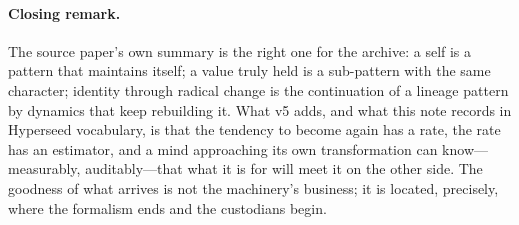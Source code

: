 \documentclass[11pt]{article}
\begin{document}
\paragraph{Closing remark.} The source paper's own summary is the right one for the
archive: a self is a pattern that maintains itself; a value truly held is a sub-pattern
with the same character; identity through radical change is the continuation of a
lineage pattern by dynamics that keep rebuilding it. What v5 adds, and what this note
records in Hyperseed vocabulary, is that the tendency to become again has a rate, the
rate has an estimator, and a mind approaching its own transformation can
know---measurably, auditably---that what it is for will meet it on the other side. The
goodness of what arrives is not the machinery's business; it is located, precisely,
where the formalism ends and the custodians begin.
\end{document}

